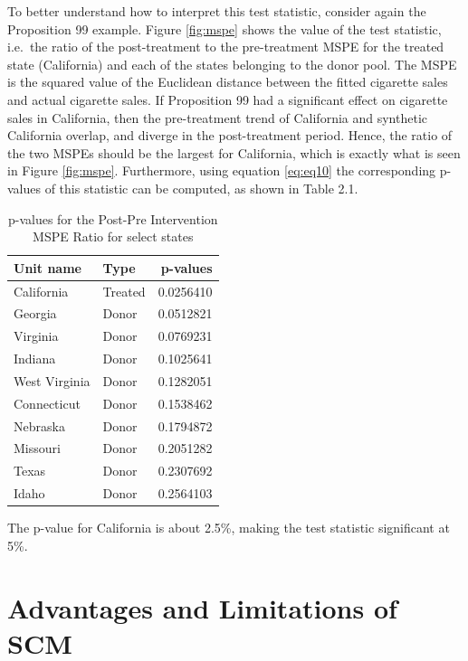 \documentclass[12pt,nobind, a4paper]{reedthesis}
\begin{document}
 To better understand how to interpret this test statistic, consider again the Proposition 99 example. Figure \ref{fig:mspe} shows the value of the test statistic, i.e.~the ratio of the post-treatment to the pre-treatment MSPE for the treated state (California) and each of the states belonging to the donor pool. The MSPE is the squared value of the Euclidean distance between the fitted cigarette sales and actual cigarette sales. If Proposition 99 had a significant effect on cigarette sales in California, then the pre-treatment trend of California and synthetic California overlap, and diverge in the post-treatment period. Hence, the ratio of the two MSPEs should be the largest for California, which is exactly what is seen in Figure \ref{fig:mspe}. Furthermore, using equation \eqref{eq:eq10} the corresponding p-values of this statistic can be computed, as shown in Table 2.1.
 \begin{table}[h!!]
 \centering
 \begin{tabular}{llr}
 \hline
 \hline
 \textbf{Unit name} & \textbf{Type}&\textbf{p-values}\\
 \hline
 \hline
 California & Treated & 0.0256410\\
 \hline
 Georgia & Donor & 0.0512821\\
 \hline
 Virginia & Donor & 0.0769231\\
 \hline
 Indiana & Donor & 0.1025641\\
 \hline
 West Virginia & Donor & 0.1282051\\
 \hline
 Connecticut & Donor & 0.1538462\\
 \hline
 Nebraska & Donor & 0.1794872\\
 \hline
 Missouri & Donor & 0.2051282\\
 \hline
 Texas & Donor & 0.2307692\\
 \hline
 Idaho & Donor & 0.2564103\\
 \hline
 \end{tabular}
 \label{tab:tab1}
 \caption{p-values for the Post-Pre Intervention MSPE Ratio for select states}
 \end{table}
 The p-value for California is about 2.5\%, making the test statistic significant at 5\%.

 \hypertarget{advdisadv}{%
 \section{Advantages and Limitations of SCM}\label{advdisadv}}
\end{document}
